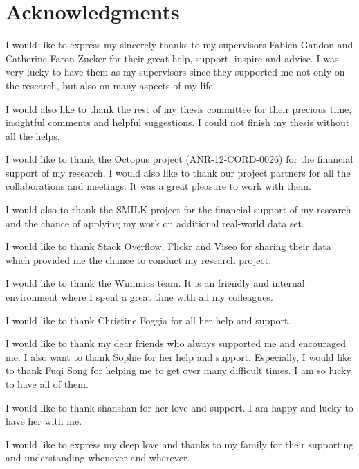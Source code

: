 \documentclass[a4paper,11pt,twoside]{ThesisStyle}
\begin{document}


\doublespacing
\dominitoc


 \cleardoublepage

\section*{Acknowledgments}

I would like to express my sincerely thanks to my supervisors Fabien Gandon and Catherine Faron-Zucker for their great help, support, inspire and advise. I was very lucky to have them as my supervisors since they supported me not only on the research, but also on many aspects of my life. 

I would also like to thank the rest of my thesis committee for their precious time, insightful comments and helpful suggestions. I could not finish my thesis without all the helps.

I would like to thank the Octopus project (ANR-12-CORD-0026) for the financial support of my research. I would also like to thank our project partners for all the collaborations and meetings. It was a great pleasure to work with them.

I would also to thank the SMILK project for the financial support of my research and the chance of applying my work on additional real-world data set.

I would like to thank Stack Overflow, Flickr and Viseo for sharing their data which provided me the chance to conduct my research project.

I would like to thank the Wimmics team. It is an friendly and internal environment where I spent a great time with all my colleagues.

I would like to thank Christine Foggia for all her help and support.

I would like to thank my dear friends who always supported me and encouraged me. I also want to thank Sophie for her help and support. Especially, I would like to thank Fuqi Song for helping me to get over many difficult times. I am so lucky to have all of them.

I would like to thank shanshan for her love and support. I am happy and lucky to have her with me.

I would like to express my deep love and thanks to my family for their supporting and understanding whenever and wherever.  
\end{document}
